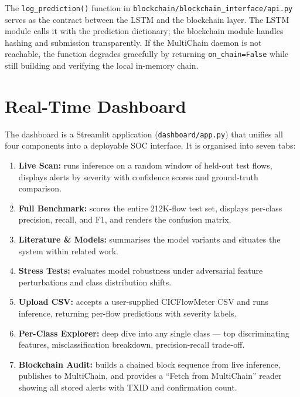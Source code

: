\documentclass[12pt]{article}
\theoremstyle{plain}
\begin{document}
The \texttt{log\_prediction()} function in \texttt{blockchain/block\-chain\_interface/api.py} serves as the contract between the LSTM and the blockchain layer. The LSTM module calls it with the prediction dictionary; the blockchain module handles hashing and submission transparently. If the MultiChain daemon is not reachable, the function degrades gracefully by returning \texttt{on\_chain=False} while still building and verifying the local in-memory chain.

\newpage
\section{Real-Time Dashboard}
\label{sec:dashboard}

The dashboard is a Streamlit application (\texttt{dashboard/app.py}) that unifies all four components into a deployable SOC interface. It is organised into seven tabs:

\begin{enumerate}
  \item \textbf{Live Scan:} runs inference on a random window of held-out test flows, displays alerts by severity with confidence scores and ground-truth comparison.
  \item \textbf{Full Benchmark:} scores the entire 212K-flow test set, displays per-class precision, recall, and F1, and renders the confusion matrix.
  \item \textbf{Literature \& Models:} summarises the model variants and situates the system within related work.
  \item \textbf{Stress Tests:} evaluates model robustness under adversarial feature perturbations and class distribution shifts.
  \item \textbf{Upload CSV:} accepts a user-supplied CICFlowMeter CSV and runs inference, returning per-flow predictions with severity labels.
  \item \textbf{Per-Class Explorer:} deep dive into any single class — top discriminating features, misclassification breakdown, precision-recall trade-off.
  \item \textbf{Blockchain Audit:} builds a chained block sequence from live inference, publishes to MultiChain, and provides a ``Fetch from MultiChain'' reader showing all stored alerts with TXID and confirmation count.
\end{enumerate}
\end{document}
